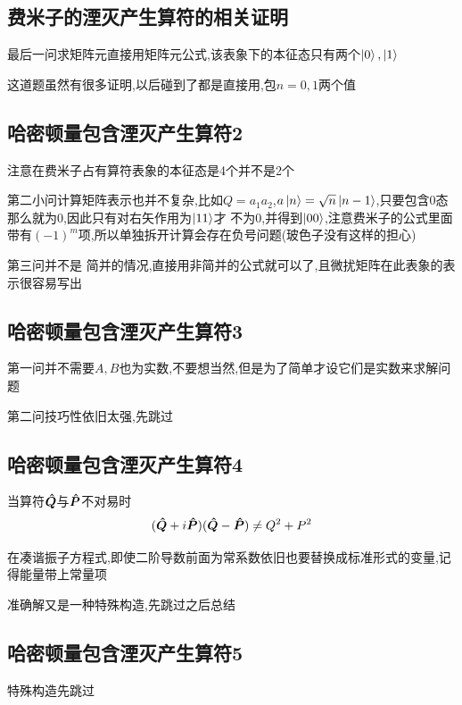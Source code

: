\documentclass{article}
\begin{document}
        \subsection{费米子的湮灭产生算符的相关证明}
            最后一问求矩阵元直接用矩阵元公式,该表象下的本征态只有两个$\ket{0} , \ket{1}$

            这道题虽然有很多证明,以后碰到了都是直接用,包$n=0,1$两个值


        \subsection{哈密顿量包含湮灭产生算符2}
            注意在费米子占有算符表象的本征态是4个并不是2个

            第二小问计算矩阵表示也并不复杂,比如$Q=a_{1}a_{2}$,$a\ket{n} = \sqrt{n} \ket{n-1}$,只要包含0态那么就为0,因此只有对右矢作用为$\ket{11}$才
            不为0,并得到$\ket{00}$,注意费米子的公式里面带有$(-1)^{m}$项,所以单独拆开计算会存在负号问题(玻色子没有这样的担心)

            第三问并不是 简并的情况,直接用非简并的公式就可以了,且微扰矩阵在此表象的表示很容易写出                  

        \subsection{哈密顿量包含湮灭产生算符3}
            第一问并不需要$A,B$也为实数,不要想当然,但是为了简单才设它们是实数来求解问题

            第二问技巧性依旧太强,先跳过

        \subsection{哈密顿量包含湮灭产生算符4}
            当算符$\vu*{Q}$与$\vu*{P}$不对易时
            $$
            (\vu*{Q} + i\vu*{P}) (\vu*{Q} - \vu*{P}) \neq Q^{2} + P^{2}
            $$

            在凑谐振子方程式,即使二阶导数前面为常系数依旧也要替换成标准形式的变量,记得能量带上常量项

            准确解又是一种特殊构造,先跳过之后总结 

        \subsection{哈密顿量包含湮灭产生算符5}
            特殊构造先跳过
\end{document}
